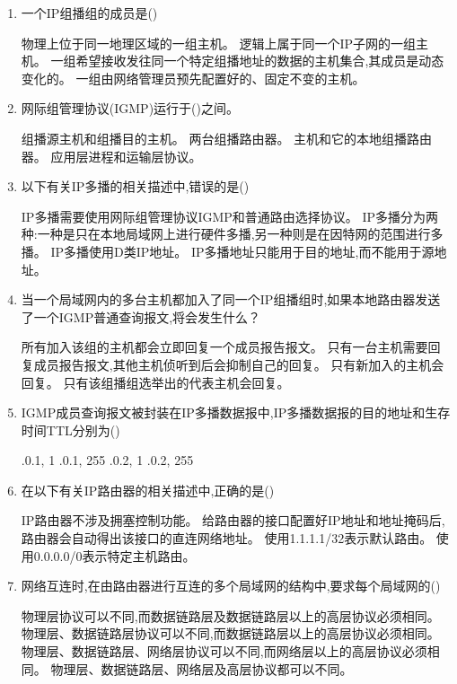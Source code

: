\documentclass[12pt, a4paper, oneside, UTF8]{ctexbook}
\begin{document}
\begin{enumerate}
    \item 一个IP组播组的成员是(\qquad)
    \begin{choices}[1]
    \task 物理上位于同一地理区域的一组主机。
    \task 逻辑上属于同一个IP子网的一组主机。
    \task 一组希望接收发往同一个特定组播地址的数据的主机集合,其成员是动态变化的。
    \task 一组由网络管理员预先配置好的、固定不变的主机。
    \end{choices}

    \item 网际组管理协议(IGMP)运行于()之间。
    \begin{choices}[1]
    \task 组播源主机和组播目的主机。
    \task 两台组播路由器。
    \task 主机和它的本地组播路由器。
    \task 应用层进程和运输层协议。
    \end{choices}

    \item 以下有关IP多播的相关描述中,错误的是(\qquad)
    \begin{choices}[1]
    \task IP多播需要使用网际组管理协议IGMP和普通路由选择协议。
    \task IP多播分为两种:一种是只在本地局域网上进行硬件多播,另一种则是在因特网的范围进行多播。
    \task IP多播使用D类IP地址。
    \task IP多播地址只能用于目的地址,而不能用于源地址。
    \end{choices}

    \item 当一个局域网内的多台主机都加入了同一个IP组播组时,如果本地路由器发送了一个IGMP普通查询报文,将会发生什么？
    \begin{choices}[1]
    \task 所有加入该组的主机都会立即回复一个成员报告报文。
    \task 只有一台主机需要回复成员报告报文,其他主机侦听到后会抑制自己的回复。
    \task 只有新加入的主机会回复。
    \task 只有该组播组选举出的代表主机会回复。
    \end{choices}

    \item IGMP成员查询报文被封装在IP多播数据报中,IP多播数据报的目的地址和生存时间TTL分别为(\qquad)
    \begin{choices}[2]
    .0.1, 1
    .0.1, 255
    .0.2, 1
    .0.2, 255
    \end{choices}

    \item 在以下有关IP路由器的相关描述中,正确的是(\qquad)
    \begin{choices}[1]
    \task IP路由器不涉及拥塞控制功能。
    \task 给路由器的接口配置好IP地址和地址掩码后,路由器会自动得出该接口的直连网络地址。
    \task 使用1.1.1.1/32表示默认路由。
    \task 使用0.0.0.0/0表示特定主机路由。
    \end{choices}

    \item 网络互连时,在由路由器进行互连的多个局域网的结构中,要求每个局域网的(\qquad)
    \begin{choices}[1]
    \task 物理层协议可以不同,而数据链路层及数据链路层以上的高层协议必须相同。
    \task 物理层、数据链路层协议可以不同,而数据链路层以上的高层协议必须相同。
    \task 物理层、数据链路层、网络层协议可以不同,而网络层以上的高层协议必须相同。
    \task 物理层、数据链路层、网络层及高层协议都可以不同。
    \end{choices}
\end{enumerate}
\end{document}

